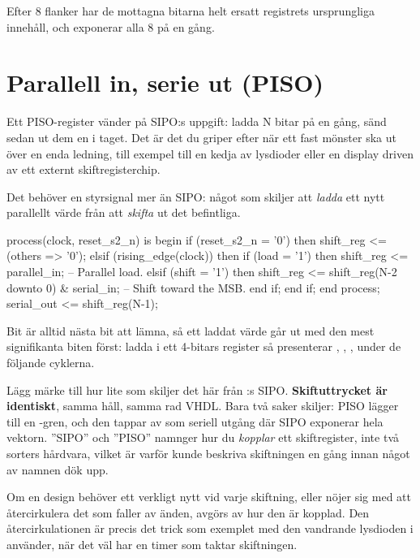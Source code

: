 Efter 8 flanker har de mottagna bitarna helt ersatt registrets ursprungliga innehåll, och
 exponerar alla 8 på en gång.

\section{Parallell in, serie ut (PISO)}
\label{c6:sec:piso}

Ett PISO-register vänder på SIPO:s uppgift: ladda N bitar på en gång, sänd sedan ut dem en i taget.
Det är det du griper efter när ett fast mönster ska ut över en enda ledning, till exempel till en
kedja av lysdioder eller en display driven av ett externt skiftregisterchip.

Det behöver en styrsignal mer än SIPO: något som skiljer att \emph{ladda} ett nytt parallellt värde
från att \emph{skifta} ut det befintliga.

\begin{vhdlcode}
process(clock, reset_s2_n) is
begin
    if (reset_s2_n = '0') then
        shift_reg <= (others => '0');
    elsif (rising_edge(clock)) then
        if (load = '1') then
            shift_reg <= parallel_in;                          -- Parallel load.
        elsif (shift = '1') then
            shift_reg <= shift_reg(N-2 downto 0) & serial_in;  -- Shift toward the MSB.
        end if;
    end if;
end process;
serial_out <= shift_reg(N-1);
\end{vhdlcode}

Bit  är alltid nästa bit att lämna, så ett laddat värde går ut med den mest signifikanta
biten först: ladda  i ett 4-bitars register så presenterar  ,
, ,  under de följande cyklerna.

Lägg märke till hur lite som skiljer det här från :s SIPO.
\textbf{Skiftuttrycket är identiskt}, samma håll, samma rad VHDL. Bara två saker skiljer: PISO
lägger till en -gren, och den tappar av  som seriell utgång där
SIPO exponerar hela vektorn. ”SIPO” och ”PISO” namnger hur du \emph{kopplar} ett skiftregister,
inte två sorters hårdvara, vilket är varför  kunde beskriva skiftningen en gång
innan något av namnen dök upp.

Om en design behöver ett verkligt nytt  vid varje skiftning, eller nöjer sig med att
återcirkulera det som faller av änden, avgörs av hur den är kopplad. Den återcirkulationen är precis
det trick som exemplet med den vandrande lysdioden i  använder, när det väl har en
timer som taktar skiftningen.

